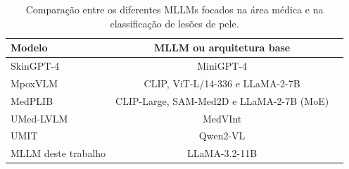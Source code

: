 \begin{table}[ht]
    \caption{\small Comparação entre os diferentes \acp{MLLM} focados na área médica e na classificação de lesões de
    pele.}
    \centering
    \begin{tabular}{l|cc}
        \hline
        Modelo                   & \ac{MLLM} ou arquitetura base                                \\ \hline
        Skin\ac{GPT}-4           & Mini\ac{GPT}-4                                               \\
        MpoxVLM                  & \ac{CLIP}, \ac{ViT}-L/14-336 e \ac{LLaMA}-2-7B               \\
        MedPLIB                  & \ac{CLIP}-Large, \ac{SAM-Med2D} e \ac{LLaMA}-2-7B (\ac{MoE}) \\
        UMed-LVLM                & MedVInt                                                      \\
        UMIT                     & Qwen2-VL                                                     \\
        \ac{MLLM} deste trabalho & \ac{LLaMA}-3.2-11B                                           \\ \hline
    \end{tabular}
    \label{tab:mllm_comparison}
\end{table}
